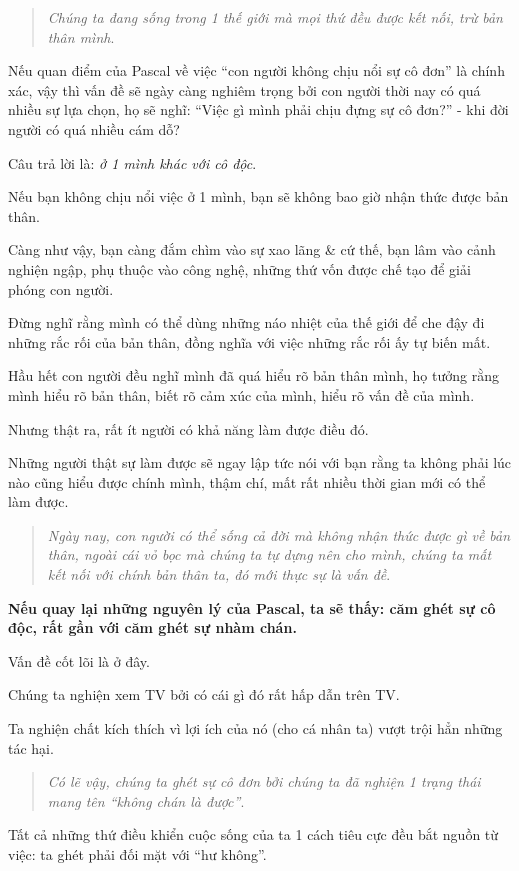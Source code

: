 \documentclass{article}
\begin{document}
\begin{quotation}
	\textit{Chúng ta đang sống trong 1 thế giới mà mọi thứ đều được kết nối, trừ bản thân mình}.
\end{quotation}
Nếu quan điểm của Pascal về việc ``con người không chịu nổi sự cô đơn'' là chính xác, vậy thì vấn đề sẽ ngày càng nghiêm trọng bởi con người thời nay có quá nhiều sự lựa chọn, họ sẽ nghĩ: ``Việc gì mình phải chịu đựng sự cô đơn?'' - khi đời người có quá nhiều cám dỗ?

%
Câu trả lời là: \textit{ở 1 mình khác với cô độc}.

Nếu bạn không chịu nổi việc ở 1 mình, bạn sẽ không bao giờ nhận thức được bản thân.

Càng như vậy, bạn càng đắm chìm vào sự xao lãng \& cứ thế, bạn lâm vào cảnh nghiện ngập, phụ thuộc vào công nghệ, những thứ vốn được chế tạo để giải phóng con người.

%
Đừng nghĩ rằng mình có thể dùng những náo nhiệt của thế giới để che đậy đi những rắc rối của bản thân, đồng nghĩa với việc những rắc rối ấy tự biến mất.

%
Hầu hết con người đều nghĩ mình đã quá hiểu rõ bản thân mình, họ tưởng rằng mình hiểu rõ bản thân, biết rõ cảm xúc của mình, hiểu rõ vấn đề của mình.

Nhưng thật ra, rất ít người có khả năng làm được điều đó.

Những người thật sự làm được sẽ ngay lập tức nói với bạn rằng ta không phải lúc nào cũng hiểu được chính mình, thậm chí, mất rất nhiều thời gian mới có thể làm được.

\begin{quotation}
	\textit{Ngày nay, con người có thể sống cả đời mà không nhận thức được gì về bản thân, ngoài cái vỏ bọc mà chúng ta tự dựng nên cho mình, chúng ta mất kết nối với chính bản thân ta, đó mới thực sự là vấn đề}.
\end{quotation}
\textbf{Nếu quay lại những nguyên lý của Pascal, ta sẽ thấy: căm ghét sự cô độc, rất gần với căm ghét sự nhàm chán.}

%
Vấn đề cốt lõi là ở đây.

Chúng ta nghiện xem TV bởi có cái gì đó rất hấp dẫn trên TV.

Ta nghiện chất kích thích vì lợi ích của nó (cho cá nhân ta) vượt trội hẳn những tác hại.

\begin{quotation}
	\textit{Có lẽ vậy, chúng ta ghét sự cô đơn bởi chúng ta đã nghiện 1 trạng thái mang tên ``không chán là được''}.
\end{quotation}
Tất cả những thứ điều khiển cuộc sống của ta 1 cách tiêu cực đều bắt nguồn từ việc: ta ghét phải đối mặt với ``hư không''.
\end{document}
